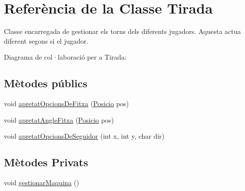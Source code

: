 \hypertarget{class_tirada}{}\section{Referència de la Classe Tirada}
\label{class_tirada}


Classe encarregada de gestionar els torns dels diferents jugadors. Aquesta actua diferent segons si el jugador.  




Diagrama de col·laboració per a Tirada\+:
\subsection*{Mètodes públics}
\begin{DoxyCompactItemize}
\item 
void \mbox{\hyperlink{class_tirada_adb40561c69d716539ea380f64872eb7b}{apretat\+Opcions\+De\+Fitxa}} (\mbox{\hyperlink{class_posicio}{Posicio}} pos)
\item 
void \mbox{\hyperlink{class_tirada_aa56dab05d4638ad1a340f42cd514d362}{apretat\+Angle\+Fitxa}} (\mbox{\hyperlink{class_posicio}{Posicio}} pos)
\item 
void \mbox{\hyperlink{class_tirada_a3c80bfbaa14b427b0221446e22fceeac}{apretat\+Opcions\+De\+Seguidor}} (int x, int y, char dir)
\end{DoxyCompactItemize}
\subsection*{Mètodes Privats}
\begin{DoxyCompactItemize}
\item 
void \mbox{\hyperlink{class_tirada_a45701d44ba8daf5236f4cf945ce81c34}{gestionar\+Maquina}} ()
\end{DoxyCompactItemize}
